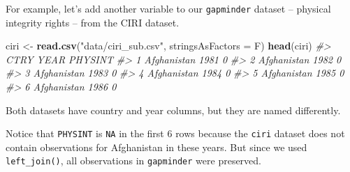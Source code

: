 \documentclass[
]{book}
\newenvironment{Shaded}{\begin{snugshade}}{\end{snugshade}}
\newcommand{\CommentTok}[1]{\textcolor[rgb]{0.56,0.35,0.01}{\textit{#1}}}
\newcommand{\DataTypeTok}[1]{\textcolor[rgb]{0.13,0.29,0.53}{#1}}
\newcommand{\KeywordTok}[1]{\textcolor[rgb]{0.13,0.29,0.53}{\textbf{#1}}}
\newcommand{\NormalTok}[1]{#1}
\newcommand{\OperatorTok}[1]{\textcolor[rgb]{0.81,0.36,0.00}{\textbf{#1}}}
\newcommand{\StringTok}[1]{\textcolor[rgb]{0.31,0.60,0.02}{#1}}
\begin{document}
For example, let's add another variable to our \texttt{gapminder} dataset -- physical integrity rights -- from the CIRI dataset.

\begin{Shaded}
\begin{Highlighting}[]
\NormalTok{ciri <-}\StringTok{ }\KeywordTok{read.csv}\NormalTok{(}\StringTok{"data/ciri_sub.csv"}\NormalTok{, }\DataTypeTok{stringsAsFactors =}\NormalTok{ F)}
\KeywordTok{head}\NormalTok{(ciri)}
\CommentTok{#>          CTRY YEAR PHYSINT}
\CommentTok{#> 1 Afghanistan 1981       0}
\CommentTok{#> 2 Afghanistan 1982       0}
\CommentTok{#> 3 Afghanistan 1983       0}
\CommentTok{#> 4 Afghanistan 1984       0}
\CommentTok{#> 5 Afghanistan 1985       0}
\CommentTok{#> 6 Afghanistan 1986       0}
\end{Highlighting}
\end{Shaded}

Both datasets have country and year columns, but they are named differently.

\begin{Shaded}
\end{Shaded}

Notice that \texttt{PHYSINT} is \texttt{NA} in the first 6 rows because the \texttt{ciri} dataset does not contain observations for Afghanistan in these years. But since we used \texttt{left\_join()}, all observations in \texttt{gapminder} were preserved.
\end{document}
